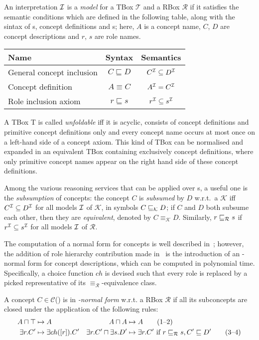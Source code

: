   An interpretation \(\mathcal{I}\) is a \emph{model} for a TBox \(\mathcal{T}\) and a RBox \(\mathcal{R}\) if it satisfies the semantic conditions which are defined in the following table, along with the sintax of \gci{}s, concept definitions and \ria{}s; here, \(A\) is a concept name, \(C\), \(D\) are concept descriptions and \(r\), \(s\) are role names.
  \begin{center}
    \begin{tabular}{lcc}
      \toprule
      Name & Syntax & Semantics \\
      \midrule
      General concept inclusion & \(C \sqsubseteq D\) & \(C^{\mathcal{I}} \subseteq D^{\mathcal{I}}\) \\
      Concept definition & \(A \equiv C\) & \(A^{\mathcal{I}} = C^{\mathcal{I}}\) \\
      Role inclusion axiom & \(r \sqsubseteq s\) & \(r^{\mathcal{I}} \subseteq s^{\mathcal{I}}\) \\
      \bottomrule
    \end{tabular}
  \end{center}
  A TBox T is called \emph{unfoldable} iff it is acyclic, consists of concept definitions and primitive concept definitions only and every concept name occurs at most once on a left-hand side of a concept axiom.
  This kind of TBox can be normalised and expanded in an equivalent TBox containing exclusively concept definitions, where only primitive concept names appear on the right hand side of these concept definitions.

  Among the various reasoning services that can be applied over \elh \kb{}s, a useful one is the \emph{subsumption} of concepts: the concept \(C\) is \emph{subsumed} by \(D\) w.r.t.\ a \kb \(\mathcal{K}\) iff \(C^{\mathcal{I}} \subseteq D^{\mathcal{I}}\) for all models \(\mathcal{I}\) of \(\mathcal{K}\), in symbols \(C \sqsubseteq_{\mathcal{K}} D\);
  if \(C\) and \(D\) both subsume each other, then they are \emph{equivalent}, denoted by \(C \equiv_{\mathcal{K}} D\).
  Similarly, \(r \sqsubseteq_{\mathcal{R}} s\) if \(r^{\mathcal{I}} \subseteq s^{\mathcal{I}}\) for all models \(\mathcal{I}\) of \(\mathcal{R}\).

  The computation of a normal form for \el concepts is well described in~\cite{DLbook}; however, the addition of role hierarchy contribution made in~\cite{LeTu12} is the introduction of an \elh-normal form for concept descriptions, which can be computed in polynomial time.
  Specifically, a choice function \(ch{}\) is devised such that every role is replaced by a picked representative of its \(\equiv_\mathcal{R}\)-equivalence class.
  \begin{definition}
    A concept \(C \in \mathcal{C}\)(\elh) is in \emph{\elh-normal form} w.r.t. a RBox \(\mathcal{R}\) if all its subconcepts are closed under the application of the following rules:
    \begin{align*}
      A \sqcap \top &\mapsto A & A \sqcap A &\mapsto A \tag{1--2}\\
      \exists{}r.C^\prime &\mapsto \exists{}ch([r]).C^\prime &
      \exists{}r.C^\prime \sqcap \exists{}s.D^\prime &\mapsto
      \exists{}r.C^\prime\,\,\text{if}\,\,r\sqsubseteq_{\mathcal{R}}s, C^\prime \sqsubseteq D^\prime \tag{3--4}
    \end{align*}
  \end{definition}
